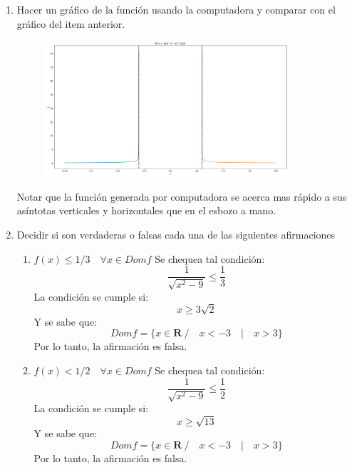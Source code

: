 \documentclass{article}
\begin{document}
\begin{enumerate}
\begin{enumerate}
              \item Hacer un gráfico de la función usando la computadora y comparar con el gráfico del item anterior.
                    \begin{figure}[H]
                        \centering
                        \includegraphics[width=9cm]{image.png}
                    \end{figure}

                    Notar que la función generada por computadora se acerca mas rápido a sus asíntotas verticales y horizontales que en el esbozo a mano.

              \item Decidir si son verdaderas o falsas cada una de las siguientes afirmaciones
                    \begin{enumerate}
                        \item $f(x) \leq 1/3 \quad \forall x \in Domf$
                              Se chequea tal condición:
                              $$\frac{1}{\sqrt{x^2-9}} \leq \frac{1}{3}$$
                              La condición se cumple si:
                              $$x \geq 3\sqrt{2}$$
                              Y se sabe que:
                              $$Domf = \{ x \in \mathbf{R}\ / \quad x<-3 \quad | \quad x>3 \}$$
                              Por lo tanto, la afirmación es falsa.
                        \item $f(x) < 1/2 \quad \forall x \in Domf$
                              Se chequea tal condición:
                              $$\frac{1}{\sqrt{x^2-9}} \leq \frac{1}{2}$$
                              La condición se cumple si:
                              $$x \geq \sqrt{13}$$
                              Y se sabe que:
                              $$Domf = \{ x \in \mathbf{R}\ / \quad x<-3 \quad | \quad x>3 \}$$
                              Por lo tanto, la afirmación es falsa.
                    \end{enumerate}
          \end{enumerate}
\end{enumerate}
\end{document}
